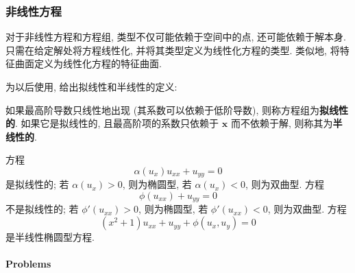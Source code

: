 \subsubsection{非线性方程}\label{subsec:nonlinear-classification}

对于非线性方程和方程组, 类型不仅可能依赖于空间中的点, 还可能依赖于解本身. 只需在给定解处将方程线性化, 并将其类型定义为线性化方程的类型. 类似地, 将特征曲面定义为线性化方程的特征曲面.

为以后使用, 给出拟线性和半线性的定义:

\begin{Definition}
\label{def:quasilinear-semilinear}
如果最高阶导数只线性地出现 (其系数可以依赖于低阶导数), 则称方程组为\textbf{拟线性的}. 如果它是拟线性的, 且最高阶项的系数只依赖于 $\bm{x}$ 而不依赖于解, 则称其为\textbf{半线性的}.
\end{Definition}

\begin{Example}
\label{ex:nonlinear-classification}
方程
\begin{equation}\label{eq:quasilinear-type-example}
\alpha(u_x)u_{xx}+u_{yy}=0
\end{equation}
是拟线性的; 若 $\alpha(u_x)>0$, 则为椭圆型, 若 $\alpha(u_x)<0$, 则为双曲型. 方程
\begin{equation}\label{eq:nonquasilinear-type-example}
\phi(u_{xx})+u_{yy}=0
\end{equation}
不是拟线性的; 若 $\phi'(u_{xx})>0$, 则为椭圆型, 若 $\phi'(u_{xx})<0$, 则为双曲型. 方程
\begin{equation}\label{eq:semilinear-elliptic-example}
(x^2+1)u_{xx}+u_{yy}+\phi(u_x,u_y)=0
\end{equation}
是半线性椭圆型方程.
\end{Example}

\paragraph*{Problems}


